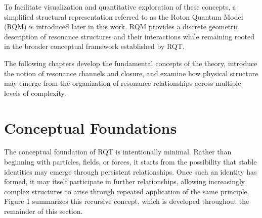 \documentclass[11pt,a4paper]{article}
\begin{document}
To facilitate visualization and quantitative exploration of these concepts, a simplified structural representation referred to as the Roton Quantum Model (RQM) is introduced later in this work. RQM provides a discrete geometric description of resonance structures and their interactions while remaining rooted in the broader conceptual framework established by RQT.

The following chapters develop the fundamental concepts of the theory, introduce the notion of resonance channels and closure, and examine how physical structure may emerge from the organization of resonance relationships across multiple levels of complexity.








\section{Conceptual Foundations}

The conceptual foundation of RQT is intentionally minimal. Rather than beginning with particles, fields, or forces, it starts from the possibility that stable identities may emerge through persistent relationships. Once such an identity has formed, it may itself participate in further relationships, allowing increasingly complex structures to arise through repeated application of the same principle. Figure 1 summarizes this recursive concept, which is developed throughout the remainder of this section.
\end{document}
